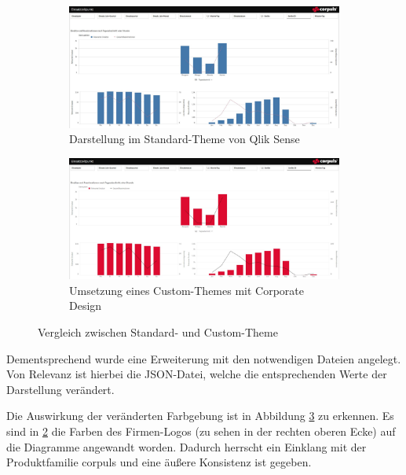\begin{figure}[ht]
\centering
\begin{subfigure}{1\linewidth}
  \centering
  \includegraphics[width=1\linewidth]{img/beforeCT}  
  \caption{Darstellung im Standard-Theme von Qlik Sense}
  \label{fig:beforeCT}
\end{subfigure}
\begin{subfigure}{1\linewidth}
  \centering
  \includegraphics[width=1\linewidth]{img/afterCT}  
  \caption{Umsetzung eines Custom-Themes mit Corporate Design}
  \label{fig:afterCT}
\end{subfigure}
\caption[Vergleich zwischen Standard- und Custom-Theme]{Vergleich zwischen Standard- und Custom-Theme}
\label{fig:custom}
\end{figure}

Dementsprechend wurde eine Erweiterung mit den notwendigen Dateien angelegt.
Von Relevanz ist hierbei die JSON-Datei, welche die entsprechenden Werte der Darstellung verändert.

Die Auswirkung der veränderten Farbgebung ist in Abbildung \ref{fig:custom} zu erkennen. 
Es sind in \ref{fig:afterCT} die Farben des Firmen-Logos (zu sehen in der rechten oberen Ecke) auf die Diagramme angewandt worden.
Dadurch herrscht ein Einklang mit der Produktfamilie \textsf{corpuls\color{corpulsred}{.web}} und eine äußere Konsistenz ist gegeben.



